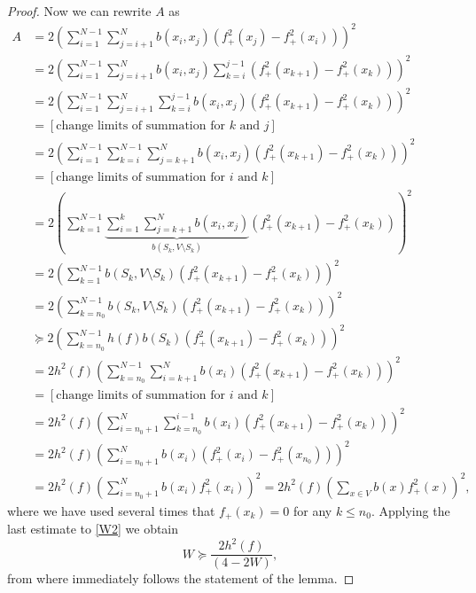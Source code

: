 \documentclass[10pt,a4paper]{amsart}
\begin{document}
\begin{proof}
Now we can rewrite $A$ as
\begin{align*}
A&=2\left(\sum_{i=1}^{N-1}\sum_{j=i+1}^N b(x_i,x_j)\left(f_+^2(x_j)-f_+^2(x_i)\right)\right)^2\\
&=2\left(\sum_{i=1}^{N-1}\sum_{j=i+1}^N b(x_i,x_j)\sum_{k=i}^{j-1}\left(f_+^2(x_{k+1})-f_+^2(x_k)\right)\right)^2\\
&=2\left(\sum_{i=1}^{N-1}\sum_{j=i+1}^N \sum_{k=i}^{j-1}b(x_i,x_j)\left(f_+^2(x_{k+1})-f_+^2(x_k)\right)\right)^2\\
&=[\mbox{change limits of summation for $k$ and $j$}]\\
&=2\left(\sum_{i=1}^{N-1}\sum_{k=i}^{N-1} \sum_{j=k+1}^{N}b(x_i,x_j)\left(f_+^2(x_{k+1})-f_+^2(x_k)\right)\right)^2\\
&=[\mbox{change limits of summation for $i$ and $k$}]\\
&=2\left(\sum_{k=1}^{N-1}\underbrace{\sum_{i=1}^{k} \sum_{j=k+1}^{N}b(x_i,x_j)}_{b(S_k,V\setminus S_k)}\left(f_+^2(x_{k+1})-f_+^2(x_k)\right)\right)^2\\
&=2\left(\sum_{k=1}^{N-1}{b(S_k,V\setminus S_k)}\left(f_+^2(x_{k+1})-f_+^2(x_k)\right)\right)^2\\
&=2\left(\sum_{k=n_0}^{N-1}{b(S_k,V\setminus S_k)}\left(f_+^2(x_{k+1})-f_+^2(x_k)\right)\right)^2\\
&\succeq 2\left(\sum_{k=n_0}^{N-1}{h(f)b(S_k)}\left(f_+^2(x_{k+1})-f_+^2(x_k)\right)\right)^2\\
&= 2h^2(f)\left(\sum_{k=n_0}^{N-1}{\sum_{i=k+1}^{N}b(x_i)}\left(f_+^2(x_{k+1})-f_+^2(x_k)\right)\right)^2\\
&=[\mbox{change limits of summation for $i$ and $k$}]\\
&=2h^2(f)\left(\sum_{i=n_0+1}^{N}{\sum_{k=n_0}^{i-1}b(x_i)}\left(f_+^2(x_{k+1})-f_+^2(x_k)\right)\right)^2\\
&=2h^2(f)\left(\sum_{i=n_0+1}^{N}{b(x_i)}\left(f_+^2(x_i)-f_+^2(x_{n_0})\right)\right)^2\\
&=2h^2(f)\left(\sum_{i=n_0+1}^{N}{b(x_i)}f_+^2(x_i)\right)^2=2h^2(f)\left(\sum_{x\in V}{b(x)}f_+^2(x)\right)^2,
\end{align*}
where we have used several times that $f_+(x_k)=0$ for any $k\le n_0$.
Applying the last estimate to \eqref{W2} we obtain 
$$
W \succeq \dfrac{2 h^2(f)}{(4-2W)},
$$
from where immediately follows the statement of the lemma.
\end{proof}
\end{document}
